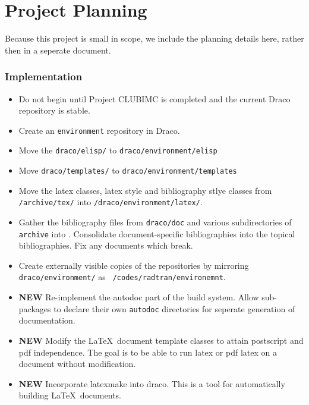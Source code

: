 \documentclass[note]{ResearchNote_pdf}
\begin{document}
\section*{Project Planning}

Because this project is small in scope, we include the planning
details here, rather then in a seperate document.

\subsubsection*{Implementation}

\begin{itemize}
\item Do not begin until Project CLUBIMC is completed and the current
  Draco repository is stable.

\item Create an {\tt environment} repository in Draco.

\item Move the {\tt draco/elisp/} to {\tt draco/environment/elisp}

\item Move {\tt draco/templates/} to {\tt draco/environment/templates}
  
\item Move the latex classes, latex style and bibliography stlye
  classes from {\tt/archive/tex/} into {\tt/draco/environment/latex/}.
  
\item Gather the bibliography files from {\tt draco/doc} and various
  subdirectories of {\tt archive} into . Consolidate document-specific
  bibliographies into the topical bibliographies. Fix any documents
  which break.
  
\item Create externally visible copies of the repositories by
  mirroring {\tt draco/environment/} as {\tt
    /codes/radtran/environemnt}.
  
\item {\bf NEW} Re-implement the autodoc part of the build system.
  Allow sub-packages to declare their own {\tt autodoc} directories
  for seperate generation of documentation.

\item {\bf NEW} Modify the \LaTeX\ document template classes to attain
  postscript and pdf independence. The goal is to be able to run latex
  or pdf latex on a document without modification.

\item {\bf NEW} Incorporate {\sf latexmake} into draco. This is a tool
  for automatically building \LaTeX\ documents. 
  
\end{itemize}
\end{document}
